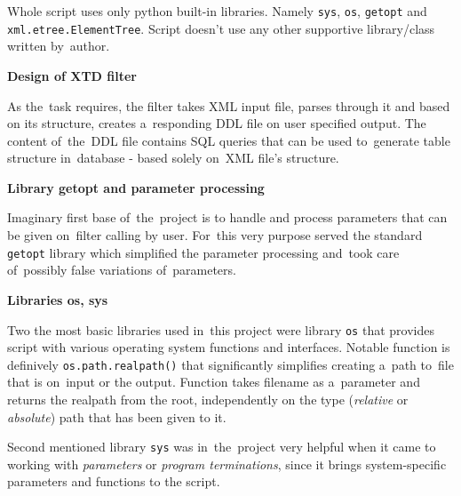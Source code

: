 \documentclass[10pt, a4paper]{report}
\begin{document}

\vspace{0.5cm}
	\par \fontsize{10pt}{1.3}\selectfont Whole script uses only python built-in libraries. Namely \verb|sys|, \verb|os|, \verb|getopt| and \verb|xml.etree.ElementTree|. Script doesn't use any other supportive library/class written by~author.

\vspace{0.5cm}
\par\noindent\fontsize{12pt}{1.3}\selectfont\textbf{Design of XTD filter}
	
	\vspace{0.15cm}
	\par \fontsize{10pt}{1.3}\selectfont As the~task requires, the filter takes XML input file, parses through it and based on its structure, creates a~responding DDL file on user specified output. The content of~the~DDL file contains SQL queries that can be used to~generate table structure in~database - based solely on~XML file's structure.


	\vspace{0.35cm}
	\par\noindent\fontsize{11pt}{1.3}\selectfont\textbf{Library getopt and parameter processing}
	\vspace{0.15cm}
	\par \fontsize{10pt}{1.3}\selectfont Imaginary first base of~the~project is to handle and process parameters that can be given on~filter calling by user. For~this very purpose served the standard \verb|getopt| library which simplified the parameter processing and~took care of~possibly false variations of~parameters.

	\vspace{0.35cm}
	\par\noindent\fontsize{11pt}{1.3}\selectfont\textbf{Libraries os, sys}
	\vspace{0.15cm}
	\par \fontsize{10pt}{1.3}\selectfont Two the most basic libraries used in~this project were library \verb|os| that provides script with various operating system functions and interfaces. Notable function is definively \verb|os.path.realpath()| that significantly simplifies creating a~path to~file that is on~input or the output. Function takes filename as a~parameter and returns the realpath from the root, independently on the type (\textit{relative} or \textit{absolute}) path that has been given to it.
	\par \fontsize{10pt}{1.3}\selectfont Second mentioned library \verb|sys| was in~the~project very helpful when it came to working with \textit{parameters} or \textit{program terminations}, since it brings system-specific parameters and functions to the script.
\end{document}

